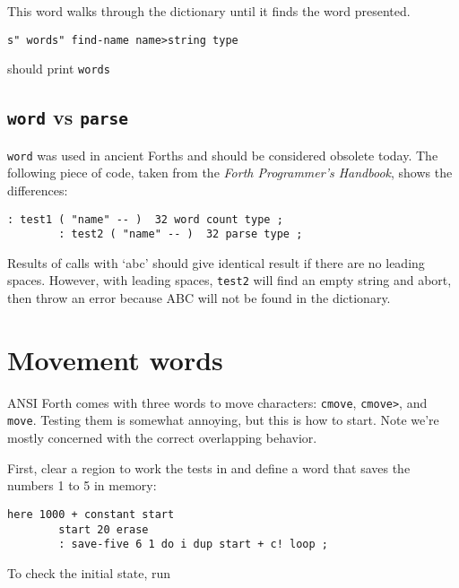 This word walks through the dictionary until it finds the word presented. 

\begin{lstlisting}[frame=lines]
        s" words" find-name name>string type
\end{lstlisting}

\noindent should print \texttt{words}


\subsection{\texttt{word} vs \texttt{parse}}

\texttt{word} was used in ancient Forths and should be
considered obsolete today. The following piece of code, taken from the
\textit{Forth Programmer's Handbook}\cite{conklinrather}, shows the differences:

\begin{lstlisting}[frame=lines]
        : test1 ( "name" -- )  32 word count type ; 
        : test2 ( "name" -- )  32 parse type ; 
\end{lstlisting}

\noindent Results of calls with `abc' should give identical result if there are no
leading spaces. However, with leading spaces, \texttt{test2} will find an empty string
and abort, then throw an error because ABC will not be found in the dictionary.

\section{Movement words}

ANSI Forth comes with three words to move characters:
\texttt{cmove},
\texttt{cmove>}, and
\texttt{move}. Testing them is somewhat annoying, but
this is how to start. Note we're mostly concerned with the correct overlapping
behavior. 

First, clear a region to work the tests in and define a word that saves the
numbers 1 to 5 in memory:

\begin{lstlisting}[frame=lines]
        here 1000 + constant start
        start 20 erase
        : save-five 6 1 do i dup start + c! loop ;
\end{lstlisting}

\noindent To check the initial state, run


